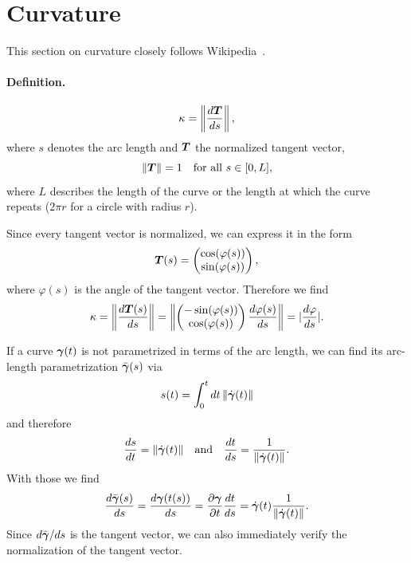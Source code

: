 
\section{Curvature}
\label{sec:curvature}

This section on curvature closely follows Wikipedia~\cite{wiki-curvature}.

\paragraph{Definition.}
\begin{equation}
  \kappa = \left\lVert \frac{d\bm{T}}{ds} \right\rVert ,
  \label{eq:curvature-def}
\end{equation}
where $s$ denotes the arc length and $\bm{T}$ the normalized tangent
vector,
\[
  \lVert \bm{T} \rVert = 1 \quad \text{for all } s \in [0, L] ,
\]
where $L$ describes the length of the curve or the length at which the
curve repeats ($2\pi r$ for a circle with radius $r$).

Since every tangent vector is normalized, we can express it in the form
\[
  \bm{T}(s) = \begin{pmatrix} \cos(\varphi(s)) \\ \sin(\varphi(s)) \end{pmatrix} ,
\]
where $\varphi(s)$ is the angle of the tangent vector.
Therefore we find
\[
  \kappa
  = \left\lVert \frac{d\bm{T}(s)}{ds} \right\rVert
  = \left\lVert \begin{pmatrix} -\sin(\varphi(s)) \\ \cos(\varphi(s)) \end{pmatrix}
    \frac{d\varphi(s)}{ds} \right\rVert
  = |\frac{d\varphi}{ds}| .
\]

If a curve $\bm{\gamma}(t)$ is not parametrized in terms of the arc
length, we can find its arc-length parametrization
$\bar{\bm{\gamma}}(s)$ via
\[
  s(t) = \int_0^t dt \, \lVert \dot{\bm{\gamma}}(t) \rVert
\]
and therefore
\[
  \frac{ds}{dt} = \lVert \dot{\bm{\gamma}}(t) \rVert
  \quad\text{and}\quad
  \frac{dt}{ds} = \frac{1}{\lVert \dot{\bm{\gamma}}(t) \rVert} .
\]
With those we find
\[
  \frac{d\bar{\bm{\gamma}}(s)}{ds}
  = \frac{d\bm{\gamma}(t(s))}{ds}
  = \frac{\partial \bm{\gamma}}{\partial t} \frac{dt}{ds}
  = \dot{\bm{\gamma}}(t) \frac{1}{\lVert \dot{\bm{\gamma}}(t) \rVert} .
\]
Since $d\bar{\bm{\gamma}}/ds$ is the tangent vector, we can also
immediately verify the normalization of the tangent vector.

